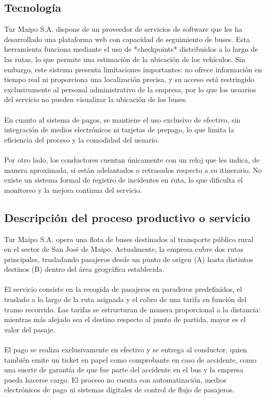 \documentclass[12pt]{article}
\begin{document}
\subsection{Tecnología}

Tur Maipo S.A. dispone de un proveedor de servicios de software que les ha desarrollado una plataforma web con capacidad de seguimiento de buses. Esta herramienta funciona mediante el uso de *checkpoints* distribuidos a lo largo de las rutas, lo que permite una estimación de la ubicación de los vehículos. Sin embargo, este sistema presenta limitaciones importantes: no ofrece información en tiempo real ni proporciona una localización precisa, y su acceso está restringido exclusivamente al personal administrativo de la empresa, por lo que los usuarios del servicio no pueden visualizar la ubicación de los buses.
\\\\

En cuanto al sistema de pagos, se mantiene el uso exclusivo de efectivo, sin integración de medios electrónicos ni tarjetas de prepago, lo que limita la eficiencia del proceso y la comodidad del usuario.
\\\\
Por otro lado, los conductores cuentan únicamente con un reloj que les indica, de manera aproximada, si están adelantados o retrasados respecto a su itinerario. No existe un sistema formal de registro de incidentes en ruta, lo que dificulta el monitoreo y la mejora continua del servicio.
\newpage
\subsection{Descripción del proceso productivo o servicio}
Tur Maipo S.A. opera una flota de buses destinados al transporte público rural en el sector de San José de Maipo. Actualmente, la empresa cubre dos rutas principales, trasladando pasajeros desde un punto de origen (A) hasta distintos destinos (B) dentro del área geográfica establecida.
\\\\
El servicio consiste en la recogida de pasajeros en paraderos predefinidos, el traslado a lo largo de la ruta asignada y el cobro de una tarifa en función del tramo recorrido. Las tarifas se estructuran de manera proporcional a la distancia: mientras más alejado sea el destino respecto al punto de partida, mayor es el valor del pasaje. 
\\\\
El pago se realiza exclusivamente en efectivo y se entrega al conductor, quien también emite un ticket en papel como comprobante en caso de accidente, como una suerte de garantía de que fue parte del accidente en el bus y la empresa pueda hacerse cargo. El proceso no cuenta con automatización, medios electrónicos de pago ni sistemas digitales de control de flujo de pasajeros.
\newpage
\end{document}
